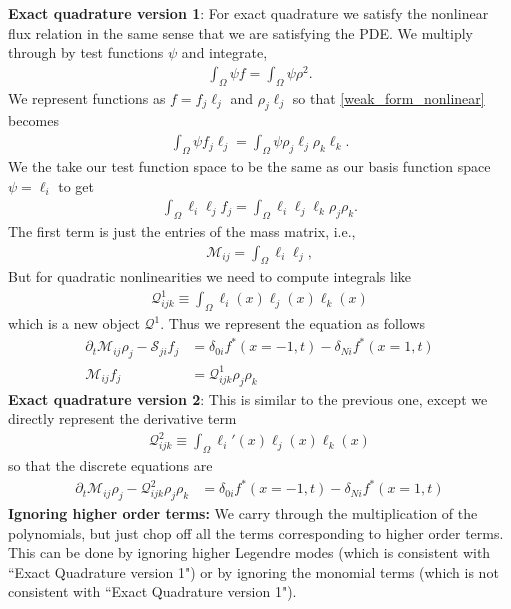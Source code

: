 \documentclass{report}
\numberwithin{equation}{section}
\begin{document}
\textbf{Exact quadrature version 1}: For exact quadrature we satisfy the nonlinear flux relation in the same sense that we are satisfying the PDE. We multiply through by test functions $\psi$ and integrate,
\begin{align}
\label{weak_form_nonlinear}
   \int_\Omega \psi f = \int_\Omega \psi \rho^2.
\end{align}
We represent functions as $f = f_j \ell_j$ and $\rho_j \ell_j$ so that \ref{weak_form_nonlinear} becomes
\begin{align}
    \int_\Omega \psi f_j \ell_j = \int_\Omega \psi \rho_j \ell_j \rho_k \ell_k.
\end{align}
We the take our test function space to be the same as our basis function space $\psi = \ell_i$ to get
\begin{align}
     \int_\Omega \ell_i  \ell_j f_j = \int_\Omega \ell_i  \ell_j  \ell_k \rho_j \rho_k.
\end{align}
The first term is just the entries of the mass matrix, i.e.,
\begin{align}
  \mathcal{M}_{ij}  =  \int_\Omega \ell_i  \ell_j ,
\end{align}
But for quadratic nonlinearities we need to compute integrals like
\begin{align}
\label{exact_quadrature_1}
   \mathcal{Q}^1_{ijk} \equiv \int_\Omega \ell_i(x) \ell_j(x) \ell_k(x)
\end{align}
which is a new object $\mathcal{Q}^1$. Thus we represent the equation as follows
\begin{align}
    \partial_t \mathcal{M}_{ij} \rho_j - \mathcal{S}_{ji} f_j &= \delta_{0i} f^*(x=-1,t) - \delta_{Ni} f^*(x=1,t) 
    \\
    \mathcal{M}_{ij} f_j &= \mathcal{Q}_{ijk}^1 \rho_j \rho_k
\end{align}
\textbf{Exact quadrature version 2}: This is similar to the previous one, except we directly represent the derivative term
\begin{align}
\label{exact_quadrature_2}
   \mathcal{Q}^2_{ijk} \equiv \int_\Omega \ell_i'(x) \ell_j(x) \ell_k(x)
\end{align}
so that the discrete equations are
\begin{align}
    \partial_t \mathcal{M}_{ij} \rho_j - \mathcal{Q}^2_{ijk} \rho_j \rho_k &= \delta_{0i} f^*(x=-1,t) - \delta_{Ni} f^*(x=1,t) 
\end{align}
\textbf{Ignoring higher order terms:} We carry through the multiplication of the polynomials, but just chop off all the terms corresponding to higher order terms. This can be done by ignoring higher Legendre modes (which is consistent with ``Exact Quadrature version 1") or by ignoring the monomial terms (which is not consistent with ``Exact Quadrature version 1"). 
\end{document}

